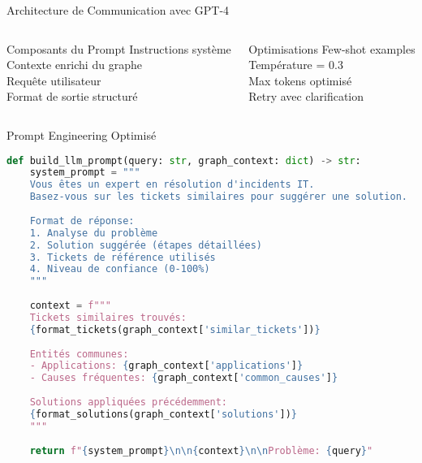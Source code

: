 \documentclass[10pt, aspectratio=169]{beamer}
\begin{document}
\begin{frame}{Architecture de Communication avec GPT-4}
    \vspace{0.3cm}
    \begin{columns}[T]
        \begin{column}{0.5\textwidth}
            \begin{block}{Composants du Prompt}
                \footnotesize
                \faCheckCircle{} Instructions système\\
                \faCheckCircle{} Contexte enrichi du graphe\\
                \faCheckCircle{} Requête utilisateur\\
                \faCheckCircle{} Format de sortie structuré
            \end{block}
        \end{column}
        \begin{column}{0.5\textwidth}
            \begin{block}{Optimisations}
                \footnotesize
                \faRocket{} Few-shot examples\\
                \faRocket{} Température = 0.3\\
                \faRocket{} Max tokens optimisé\\
                \faRocket{} Retry avec clarification
            \end{block}
        \end{column}
    \end{columns}
\end{frame}

\begin{frame}[fragile]{Prompt Engineering Optimisé}
    \begin{lstlisting}[language=Python, basicstyle=\scriptsize\ttfamily]
def build_llm_prompt(query: str, graph_context: dict) -> str:
    system_prompt = """
    Vous êtes un expert en résolution d'incidents IT.
    Basez-vous sur les tickets similaires pour suggérer une solution.
    
    Format de réponse:
    1. Analyse du problème
    2. Solution suggérée (étapes détaillées)
    3. Tickets de référence utilisés
    4. Niveau de confiance (0-100%)
    """
    
    context = f"""
    Tickets similaires trouvés:
    {format_tickets(graph_context['similar_tickets'])}
    
    Entités communes:
    - Applications: {graph_context['applications']}
    - Causes fréquentes: {graph_context['common_causes']}
    
    Solutions appliquées précédemment:
    {format_solutions(graph_context['solutions'])}
    """
    
    return f"{system_prompt}\n\n{context}\n\nProblème: {query}"
    \end{lstlisting}
\end{frame}
\end{document}
